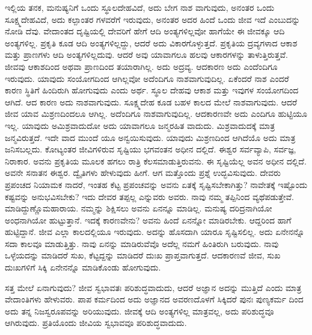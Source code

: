 ಇಲ್ಲಿಯ ತನಕ, ಮನುಷ್ಯನಿಗೆ ಒಂದು ಸ್ಥೂಲದೇಹವಿದೆ, ಅದು ಬೇಗ ನಾಶ ವಾಗುವುದು, ಅನಂತರ ಒಂದು ಸೂಕ್ಷ್ಮದೇಹವಿದೆ, ಅದು ಕಲ್ಪಾಂತರ ಗಳವರೆಗೆ ಇರುವುದು, ಅನಂತರ ಅದರ ಹಿಂದೆ ಒಂದು ಜೀವ ಇದೆ ಎಂಬುದನ್ನು ನೋಡಿ ದೆವು. ವೇದಾಂತದ ದೃಷ್ಟಿಯಲ್ಲಿ ದೇವರಿಗೆ ಹೇಗೆ ಆದಿ ಅಂತ್ಯಗಳಿಲ್ಲವೋ ಹಾಗೆಯೇ ಈ ಜೀವಕ್ಕೂ ಆದಿ ಅಂತ್ಯಗಳಿಲ್ಲ. ಪ್ರಕೃತಿ ಕೂಡ ಆದಿ ಅಂತ್ಯಗಳಿಲ್ಲದ್ದು, ಆದರೆ ಅದು ವಿಕಾರಗೊಳ್ಳುತ್ತದೆ. ಪ್ರಕೃತಿಯ ದ್ರವ್ಯಗಳಾದ ಆಕಾಶ ಮತ್ತು ಪ್ರಾಣಗಳು ಆದಿ ಅಂತ್ಯಗಳಿಲ್ಲದುವು. ಆದರೆ ಅವು ಯಾವಾಗಲೂ ಹಲವು ಆಕಾರಗಳನ್ನು ತಾಳುತ್ತಿರುತ್ತವೆ. ಜೀವವು ಆಕಾಶದಿಂದ ಅಥವಾ ಪ್ರಾಣದಿಂದ ತಯಾರಾಗಿಲ್ಲ. ಅದು ಅದ್ರವ್ಯ. ಆದಕಾರಣ ಅದು ಎಂದೆಂದಿಗೂ ಇರುವುದು. ಯಾವುದು ಸಂಯೋಗದಿಂದ ಆಗಿಲ್ಲವೋ ಅದೆಂದಿಗೂ ನಾಶವಾಗುವುದಿಲ್ಲ. ಏಕೆಂದರೆ ನಾಶ ಎಂದರೆ ಕಾರಣ ಸ್ಥಿತಿಗೆ ಹಿಂದಿರುಗಿ ಹೋಗುವುದು ಎಂದು ಅರ್ಥ. ಸ್ಥೂಲ ದೇಹವು ಆಕಾಶ ಮತ್ತು ಇವುಗಳ ಸಂಯೋಗದಿಂದ ಆಗಿದೆ. ಆದ ಕಾರಣ ಅದು ನಾಶವಾಗುವುದು. ಸೂಕ್ಷ್ಮದೇಹ ಕೂಡ ಬಹಳ ಕಾಲದ ಮೇಲೆ ನಾಶವಾಗುವುದು. ಆದರೆ ಜೀವ ಯಾವ ಮಿಶ್ರಣದಿಂದಲೂ ಆಗಿಲ್ಲ. ಅದೆಂದಿಗೂ ನಾಶವಾಗುವುದಿಲ್ಲ. ಆದಕಾರಣವೇ ಅದು ಎಂದಿಗೂ ಹುಟ್ಟಿಯೂ ಇಲ್ಲ. ಯಾವುದು ಅಮಿಶ್ರವಾದುದೋ ಅದು ಯಾವಾಗಲೂ ಜನ್ಮರಹಿತ ವಾದುದು. ಮಿಶ್ರವಾದುದಕ್ಕೆ ಮಾತ್ರ ಜನ್ಮವಿರುತ್ತದೆ. ಇದೇ ವಾದ ಮುಂದೆ ಯೂ ಅನ್ವಯಿಸುವುದು. ಯಾವುದು ಮಿಶ್ರಣದಿಂದ ಆಗಿದೆಯೊ ಅದು ಮಾತ್ರ ಜನಿಸಬಲ್ಲದು. ಕೋಟ್ಯಂತರ ಜೀವಿಗಳಿರುವ ಸೃಷ್ಟಿಯು ಭಗವಂತನ ಅಧೀನ ದಲ್ಲಿದೆ. ಈಶ್ವರ ಸರ್ವವ್ಯಾಪಿ, ಸರ್ವಜ್ಞ, ನಿರಾಕಾರ. ಅವನು ಪ್ರಕೃತಿಯ ಮೂಲಕ ಹಗಲು ರಾತ್ರಿ ಕೆಲಸಮಾಡುತ್ತಿರುವನು. ಈ ಸೃಷ್ಟಿಯೆಲ್ಲ ಅವನ ಅಧೀನ ದಲ್ಲಿದೆ. ಅವನೇ ಸನಾತನ ಈಶ್ವರ. ದ್ವೈತಿಗಳು ಹೇಳುವುದು ಹೀಗೆ. ಆಗ ಮತ್ತೊಂದು ಪ್ರಶ್ನೆ ಉದ್ಭವಿಸುವುದು. ದೇವರು ಪ್ರಪಂಚದ ನಿಯಾಮಕ ನಾದರೆ, ಇಂತಹ ಕೆಟ್ಟ ಪ್ರಪಂಚವನ್ನು ಅವನು ಏತಕ್ಕೆ ಸೃಷ್ಟಿಸಬೇಕಾಗಿತ್ತು? ನಾವೇತಕ್ಕೆ ಇಷ್ಟೊಂದು ಕಷ್ಟವನ್ನು ಅನುಭವಿಸಬೇಕು? ಇದು ದೇವರ ತಪ್ಪಲ್ಲ ಎನ್ನುವರು ಅವರು. ನಾವು ನಮ್ಮ ತಪ್ಪಿನಿಂದ ವ್ಯಥೆಪಡುತ್ತೇವೆ. ಮಾಡಿದ್ದುಣ್ಣೊಮಹಾರಾಯ. ನಮ್ಮನ್ನು ಶಿಕ್ಷಿಸಲು ಅವನು ಏನನ್ನೂ ಮಾಡಿಲ್ಲ. ಮನುಷ್ಯ ದರಿದ್ರನಾಗಿಯೋ ಅಂಧನಾಗಿಯೋ ಹುಟ್ಟುತ್ತಾನೆ. ಇದಕ್ಕೆ ಕಾರಣವೇನು? ಅವನು ಹಿಂದೆ ಏನನ್ನೋ ಮಾಡಿರಬೇಕು. ಆದ್ದರಿಂದ ಹಾಗೆ ಹುಟ್ಟಿದ್ದಾನೆ. ಜೀವ ಎಲ್ಲಾ ಕಾಲದಲ್ಲಿಯೂ ಇರುವುದು. ಅದನ್ನು ಹೊಸದಾಗಿ ಯಾರೂ ಸೃಷ್ಟಿಸಲಿಲ್ಲ. ಅದು ಏನೇನನ್ನೊ ಸದಾ ಕಾಲವೂ ಮಾಡುತ್ತಿತ್ತು. ನಾವು ಏನನ್ನು ಮಾಡಿರುವೆವೊ ಅದೆಲ್ಲ ನಮಗೆ ಹಿಂತಿರುಗಿ ಬರುವುದು. ನಾವು ಒಳ್ಳೆಯದನ್ನು ಮಾಡಿದರೆ ಸುಖ, ಕೆಟ್ಟದ್ದನ್ನು ಮಾಡಿದರೆ ದುಃಖ ಪ್ರಾಪ್ತವಾಗುತ್ತದೆ. ಆದಕಾರಣವೆ ಜೀವ, ಸುಖ ದುಃಖಗಳಿಗೆ ಸಿಕ್ಕಿ ಏನೇನನ್ನೊ ಮಾಡಿಕೊಂಡು ಹೋಗುವುದು.

ಸತ್ತ ಮೇಲೆ ಏನಾಗುವುದು? ಜೀವ ಸ್ವಭಾವತಃ ಪರಿಶುದ್ಧವಾದುದು, ಆದರೆ ಅಜ್ಞಾನ ಅದನ್ನು ಮುತ್ತಿದೆ ಎಂದು ಮಾತ್ರ ವೇದಾಂತಿಗಳು ಹೇಳುವರು. ಪಾಪ ಕರ್ಮದಿಂದ ಅದು ಅಜ್ಞಾನದ ಅವರಣದೊಳಗೆ ಸಿಕ್ಕಿದರೆ ಪುನಃ ಪುಣ್ಯಕರ್ಮ ದಿಂದ ಅದು ತನ್ನ ನಿಜಸ್ವರೂಪವನ್ನು ಅರಿಯುವುದು. ಜೀವಕ್ಕೆ ಆದಿ ಅಂತ್ಯಗಳಿಲ್ಲ ಮಾತ್ರವಲ್ಲ, ಅದು ಪರಿಶುದ್ಧವೂ ಆಗಿರುವುದು. ಪ್ರತಿಯೊಂದು ಜೀವಿಯ ಸ್ವಭಾವವೂ ಪರಿಶುದ್ಧವಾದುದು.

